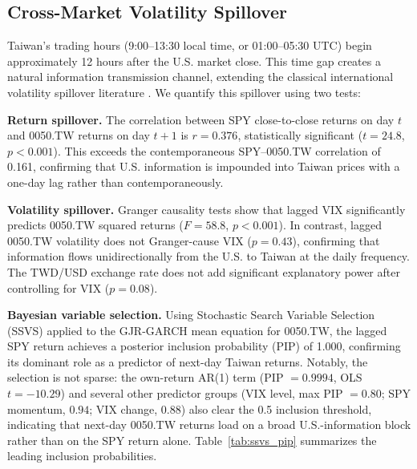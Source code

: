 \subsection{Cross-Market Volatility Spillover}
\label{sec:spillover}

Taiwan's trading hours (9:00--13:30 local time, or 01:00--05:30 UTC) begin approximately 12 hours after the U.S. market close. This time gap creates a natural information transmission channel, extending the classical international volatility spillover literature \citep{hamao1990,lin1994}. We quantify this spillover using two tests:

\textbf{Return spillover.} The correlation between SPY close-to-close returns on day $t$ and 0050.TW returns on day $t+1$ is $r = 0.376$, statistically significant ($t = 24.8$, $p < 0.001$). This exceeds the contemporaneous SPY--0050.TW correlation of 0.161, confirming that U.S. information is impounded into Taiwan prices with a one-day lag rather than contemporaneously.

\textbf{Volatility spillover.} Granger causality tests show that lagged VIX significantly predicts 0050.TW squared returns ($F = 58.8$, $p < 0.001$). In contrast, lagged 0050.TW volatility does not Granger-cause VIX ($p = 0.43$), confirming that information flows unidirectionally from the U.S. to Taiwan at the daily frequency. The TWD/USD exchange rate does not add significant explanatory power after controlling for VIX ($p = 0.08$).

\textbf{Bayesian variable selection.} Using Stochastic Search Variable Selection (SSVS) applied to the GJR-GARCH mean equation for 0050.TW, the lagged SPY return achieves a posterior inclusion probability (PIP) of 1.000, confirming its dominant role as a predictor of next-day Taiwan returns. Notably, the selection is not sparse: the own-return AR(1) term (PIP $= 0.9994$, OLS $t = -10.29$) and several other predictor groups (VIX level, max PIP $= 0.80$; SPY momentum, $0.94$; VIX change, $0.88$) also clear the 0.5 inclusion threshold, indicating that next-day 0050.TW returns load on a broad U.S.-information block rather than on the SPY return alone. Table~\ref{tab:ssvs_pip} summarizes the leading inclusion probabilities.

